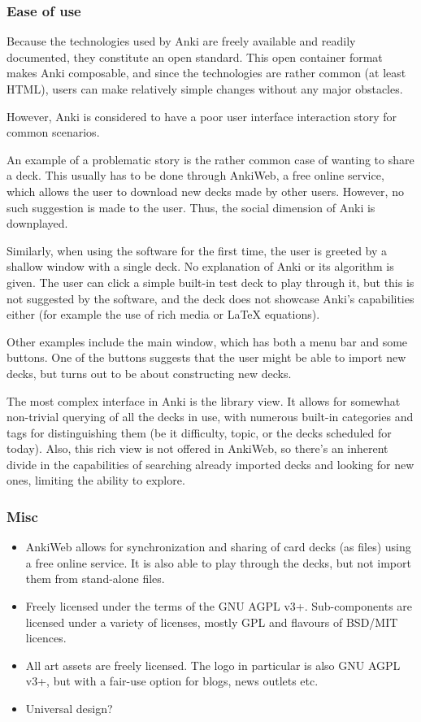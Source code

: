 \subsubsection{Ease of use}

Because the technologies used by Anki are freely available and readily
documented, they constitute an open standard. This open container format makes
Anki composable, and since the technologies are rather common (at least HTML),
users can make relatively simple changes without any major obstacles.

However, Anki is considered to have a poor user interface interaction story 
for common scenarios\cite{pcworldanki}.

An example of a problematic story is the rather common case of wanting to share
a deck. This usually has to be done through AnkiWeb, a free online service, 
which allows the user to download new decks made by other users. However, no such
suggestion is made to the user. Thus, the social dimension of Anki is 
downplayed.

Similarly, when using the software for the first time, the user is greeted by 
a shallow window with a single deck. No explanation of Anki or its algorithm 
is given. The user can click a simple built-in test deck to play through it, 
but this is not suggested by the software, and the deck does not showcase 
Anki's capabilities either (for example the use of rich media or LaTeX 
equations).

Other examples include the main window, which has both a menu bar and some
buttons. One of the buttons suggests that the user might be able to import new
decks, but turns out to be about constructing new decks.

The most complex interface in Anki is the library view. It allows for somewhat
non-trivial querying of all the decks in use, with numerous built-in categories
and tags for distinguishing them (be it difficulty, topic, or the decks
scheduled for today). Also, this rich view is not offered in AnkiWeb, so there's
an inherent divide in the capabilities of searching already imported decks and
looking for new ones, limiting the ability to explore.

\subsubsection{Misc}

\begin{itemize}
\item AnkiWeb allows for synchronization and sharing of card decks (as files) using
  a free online service. It is also able to play through the decks, but not
  import them from stand-alone files.
\item Freely licensed under the terms of the GNU AGPL v3+. Sub-components are
  licensed under a variety of licenses, mostly GPL and flavours of BSD/MIT 
  licences.
\item All art assets are freely licensed. The logo in particular is also GNU AGPL
  v3+, but with a fair-use option for blogs, news outlets etc.
\item Universal design? %
\end{itemize}

